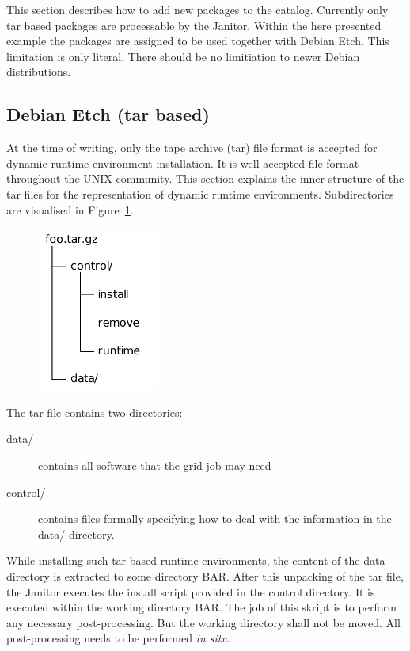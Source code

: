 This section describes how to add new packages to the catalog. Currently
only tar based packages are processable by the Janitor.  Within the here
presented example the packages are assigned to be used together with
Debian Etch. This limitation is only literal. 
There should be no limitiation to newer Debian distributions.

\subsection{Debian Etch (tar based)}

At the time of writing, only the tape archive (tar) file format is accepted for dynamic runtime environment installation. 
It is well accepted file format throughout the UNIX community. This section explains the inner structure of the tar files
for the representation of dynamic runtime environments. 
Subdirectories are visualised in Figure~\ref{fig:tar_folder}.

\begin{figure}
  \begin{center}
    \includegraphics[width=4cm]{images/tar_folder.pdf}
    \label{fig:tar_folder}
  \end{center}
\end{figure}

The tar file contains two directories:
\begin{description}
\item [data/] contains all software that the grid-job may need
\item [control/] contains files formally specifying how to deal with the information in the data/ directory.
\end{description}

While installing such tar-based runtime environments, the content of the data directory is extracted to some directory \textdollar BAR. 
After this unpacking of the tar file, the Janitor executes the install script provided in the control directory. 
It is executed within the working directory \textdollar BAR. The job of this skript is to perform any necessary post-processing.
But the working directory shall not be moved. All post-processing needs to be performed \textit{in situ}.

